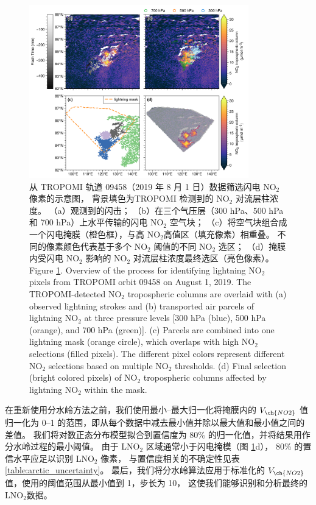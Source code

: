 \begin{figure}[H]
\centering
\includegraphics[width=0.85\textwidth]{./figures/arctic_workflow.png}
\caption{
从 TROPOMI 轨道 09458（2019 年 8 月 1 日）数据筛选闪电 NO$_2$ 像素的示意图，
背景填色为TROPOMI 检测到的 NO$_2$ 对流层柱浓度。
（a）观测到的闪击；
（b）在三个气压层（300 hPa、500 hPa 和 700 hPa）上水平传输的闪电 NO$_2$ 空气块；
（c）将空气块组合成一个闪电掩膜（橙色框），与高 NO$_2$高值区（填充像素）相重叠。
不同的像素颜色代表基于多个 NO$_2$ 阈值的不同 NO$_2$ 选区；
（d）掩膜内受闪电 NO$_2$ 影响的 NO$_2$ 对流层柱浓度最终选区（亮色像素）。\\
Figure \ref{fig:workflow}. Overview of the process for identifying lightning NO$_2$ pixels from TROPOMI orbit 09458 on August 1, 2019.
The TROPOMI-detected NO$_2$ tropospheric columns are overlaid with (a) observed lightning strokes and
(b) transported air parcels of lightning NO$_2$ at three pressure levels [300 hPa (blue), 500 hPa (orange), and 700 hPa (green)].
(c) Parcels are combined into one lightning mask (orange circle), which overlaps with high NO$_2$ selections (filled pixels). The different pixel colors represent different NO$_2$ selections based on multiple NO$_2$ thresholds.
(d) Final selection (bright colored pixels) of NO$_2$ tropospheric columns affected by lightning NO$_2$ within the mask.
}
\label{fig:workflow}
\end{figure}

在重新使用分水岭方法之前，我们使用最小--最大归一化将掩膜内的 $V_{\ch{NO2}}$ 值归一化为 0--1 的范围，即从每个数据中减去最小值并除以最大值和最小值之间的差值。
我们将对数正态分布模型拟合到置信度为 80\% 的归一化值，并将结果用作分水岭过程的最小阈值。
由于 LNO$_2$ 区域通常小于闪电掩模（图 \ref{fig:workflow}d），
80\% 的置信水平应足以识别 LNO$_2$ 像素，
与置信度相关的不确定性见表 \ref{table:arctic_uncertainty}。
最后，我们将分水岭算法应用于标准化的 $V_{\ch{NO2}}$ 值，使用的阈值范围从最小值到 1，步长为 10，
这使我们能够识别和分析最终的LNO$_2$数据。


